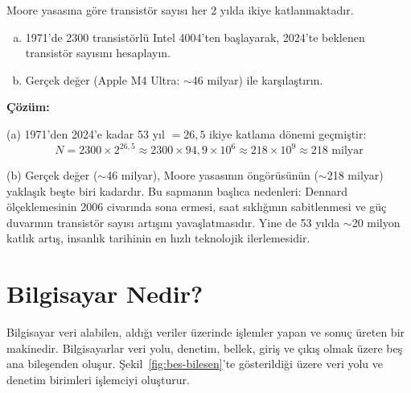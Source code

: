 \begin{ornek}[1.1]
\label{orn:moore-hesaplama}
Moore yasasına göre transistör sayısı her 2 yılda ikiye katlanmaktadır.
\begin{enumerate}[(a)]
\item 1971'de 2300 transistörlü Intel 4004'ten başlayarak, 2024'te beklenen transistör sayısını hesaplayın.
\item Gerçek değer (Apple M4 Ultra: $\sim$46 milyar) ile karşılaştırın.
\end{enumerate}

\textbf{Çözüm:}

(a) 1971'den 2024'e kadar 53 yıl $= 26{,}5$ ikiye katlama dönemi geçmiştir:
\[
N = 2300 \times 2^{26{,}5} \approx 2300 \times 94{,}9 \times 10^{6} \approx 218 \times 10^{9} \approx 218 \text{ milyar}
\]

(b) Gerçek değer ($\sim$46 milyar), Moore yasasının öngörüsünün ($\sim$218 milyar) yaklaşık beşte biri kadardır. Bu sapmanın başlıca nedenleri: Dennard ölçeklemesinin 2006 civarında sona ermesi, saat sıklığının sabitlenmesi ve güç duvarının transistör sayısı artışını yavaşlatmasıdır. Yine de 53 yılda $\sim$20 milyon katlık artış, insanlık tarihinin en hızlı teknolojik ilerlemesidir.
\end{ornek}

\section{Bilgisayar Nedir?}
\label{sec:bilgisayar-nedir}

Bilgisayar veri alabilen, aldığı veriler üzerinde işlemler yapan ve sonuç üreten bir makinedir. Bilgisayarlar veri yolu, denetim, bellek, giriş ve çıkış olmak üzere beş ana bileşenden oluşur. Şekil~\ref{fig:bes-bilesen}'te gösterildiği üzere veri yolu ve denetim birimleri işlemciyi oluşturur.

